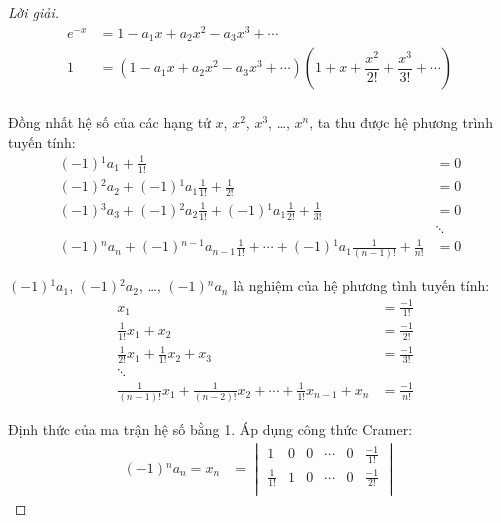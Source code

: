 \documentclass[class=linearalgebra,crop=false]{standalone}
\begin{document}
\begin{proof}[Lời giải]
    \begingroup
    \allowdisplaybreaks
    \begin{align*}
        e^{-x} & = 1 - a_{1}x + a_{2}x^{2} - a_{3}x^{3} + \cdots \\
        1      & = (1 - a_{1}x + a_{2}x^{2} - a_{3}x^{3} + \cdots)\left(1 + x + \dfrac{x^{2}}{2!} + \dfrac{x^{3}}{3!} + \cdots\right) \\
    \end{align*}
    \endgroup
    \par Đồng nhất hệ số của các hạng tử $x$, $x^{2}$, $x^{3}$, \ldots, $x^{n}$, ta thu được hệ phương trình tuyến tính:
    \begin{align*}
        (-1){}^{1}a_{1} + \frac{1}{1!} & = 0 \\
        (-1){}^{2}a_{2} + (-1){}^{1}a_{1}\frac{1}{1!} + \frac{1}{2!} & = 0 \\
        (-1){}^{3}a_{3} + (-1){}^{2}a_{2}\frac{1}{1!} + (-1){}^{1}a_{1}\frac{1}{2!} + \frac{1}{3!} & = 0 \\
        & \ddots \\
        (-1){}^{n}a_{n} + (-1){}^{n-1}a_{n-1}\frac{1}{1!} + \cdots + (-1){}^{1}a_{1}\frac{1}{(n-1)!} + \frac{1}{n!} & = 0
    \end{align*}
    \par $(-1){}^{1}a_{1}$, $(-1){}^{2}a_{2}$, \ldots, $(-1){}^{n}a_{n}$ là nghiệm của hệ phương tình tuyến tính:
    \begin{align*}
        &x_{1} & = \frac{-1}{1!} \\
        &\frac{1}{1!}x_{1} + x_{2} & = \frac{-1}{2!} \\
        &\frac{1}{2!}x_{1} + \frac{1}{1!}x_{2} + x_{3} & = \frac{-1}{3!} \\
        & \ddots  &  \\
        &\frac{1}{(n-1)!}x_{1} + \frac{1}{(n-2)!}x_{2} + \cdots + \frac{1}{1!}x_{n-1} + x_{n} & = \frac{-1}{n!}
    \end{align*}
    \par Định thức của ma trận hệ số bằng 1. Áp dụng công thức Cramer:
    \begin{align*}
        (-1){}^{n}a_{n} = x_{n} & =
        \begin{vmatrix}
            1                & 0                & 0                & \cdots & 0            & \frac{-1}{1!} \\
            \frac{1}{1!}     & 1                & 0                & \cdots & 0            & \frac{-1}{2!} \\

\end{vmatrix}
\end{align*}
\end{proof}
\end{document}

